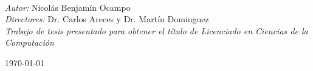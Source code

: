 \documentclass[a4paper,11pt,oneside]{book}
\begin{document}
\begin{titlepage}
\begin{center}
            \linespread{1}~\\[1cm]
            {\Large
                \emph{Autor:} Nicolás Benjamín Ocampo
            }\\[1cm]
            {\Large
                \emph{Directores:} Dr. Carlos Areces y Dr. Martín Dominguez
                }\\[1cm] %
            
            \vfill
            \Large \emph{Trabajo de tesis presentado para obtener el título de Licenciado en Ciencias de la Computación}\\[0.3cm] 
            
            \vspace{0.8cm}
            
            
            \vspace{0.8cm}
            
            \today %
        \end{center}
    \end{titlepage}
    
    \newpage
    
     
    
    
   
\end{document}
